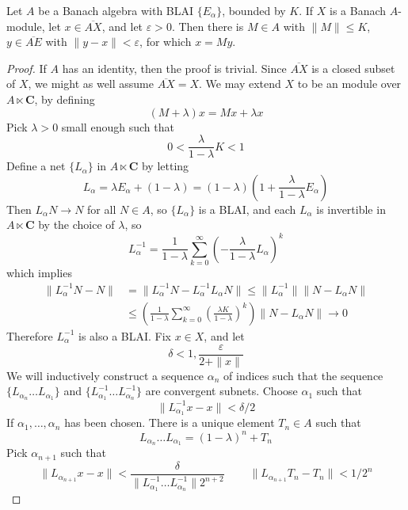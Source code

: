 \begin{theorem}
    Let $A$ be a Banach algebra with BLAI $\{ E_\alpha \}$, bounded by $K$. If $X$ is a Banach $A$-module, let $x \in \overline{AX}$, and let $\varepsilon > 0$. Then there is $M \in A$ with $\| M \| \leq K$, $y \in \overline{AE}$ with $\| y - x \| < \varepsilon$, for which $x = My$.
\end{theorem}
\begin{proof}
    If $A$ has an identity, then the proof is trivial. Since $\overline{AX}$ is a closed subset of $X$, we might as well assume $\overline{AX} = X$. We may extend $X$ to be an module over $A \ltimes \mathbf{C}$, by defining
    \[ (M + \lambda) x = Mx + \lambda x \]
    Pick $\lambda > 0$ small enough such that
    \[ 0 < \frac{\lambda}{1 - \lambda} K < 1 \]
    Define a net $\{ L_\alpha \}$ in $A \ltimes \mathbf{C}$ by letting
    \[ L_\alpha = \lambda E_\alpha + (1 - \lambda) = (1 - \lambda) \left( 1 + \frac{\lambda}{1 - \lambda} E_\alpha \right) \]
    Then $L_\alpha N \to N$ for all $N \in A$, so $\{ L_\alpha \}$ is a BLAI, and each $L_\alpha$ is invertible in $A \ltimes \mathbf{C}$ by the choice of $\lambda$, so
    \[ L_\alpha^{-1} = \frac{1}{1 - \lambda} \sum_{k = 0}^\infty \left(- \frac{\lambda}{1 - \lambda} L_\alpha \right)^k \]
    which implies
    \begin{align*}
        \| L_\alpha^{-1} N - N \| &= \| L_\alpha^{-1} N - L_\alpha^{-1} L_\alpha N \| \leq \| L_\alpha^{-1} \| \| N - L_\alpha N \|\\
        &\leq \left( \frac{1}{1 - \lambda} \sum_{k = 0}^\infty \left( \frac{\lambda K}{1 - \lambda} \right)^k \right) \| N - L_\alpha N \| \to 0
    \end{align*}
    Therefore $L_\alpha^{-1}$ is also a BLAI. Fix $x \in X$, and let
    \[ \delta < 1, \frac{\varepsilon}{2 + \|x\|} \]
    We will inductively construct a sequence $\alpha_n$ of indices such that the sequence $\{ L_{\alpha_n} \dots L_{\alpha_1} \}$ and $\{ L_{\alpha_1}^{-1} \dots L_{\alpha_n}^{-1} \}$ are convergent subnets. Choose $\alpha_1$ such that
    \[ \| L_{\alpha_1}^{-1} x - x \| < \delta/2 \]
    If $\alpha_1, \dots, \alpha_n$ has been chosen. There is a unique element $T_n \in A$ such that
    \[  L_{\alpha_n} \dots L_{\alpha_1} = (1 - \lambda)^n + T_n \]
    Pick $\alpha_{n+1}$ such that
    \[ \| L_{\alpha_{n+1}} x - x \| < \frac{\delta}{\| L_{\alpha_1}^{-1} \dots L_{\alpha_n}^{-1} \| 2^{n+2}}\ \ \ \ \ \ \ \ \ \ \| L_{\alpha_{n+1}} T_n - T_n \| < 1/2^n \]

\end{proof}
